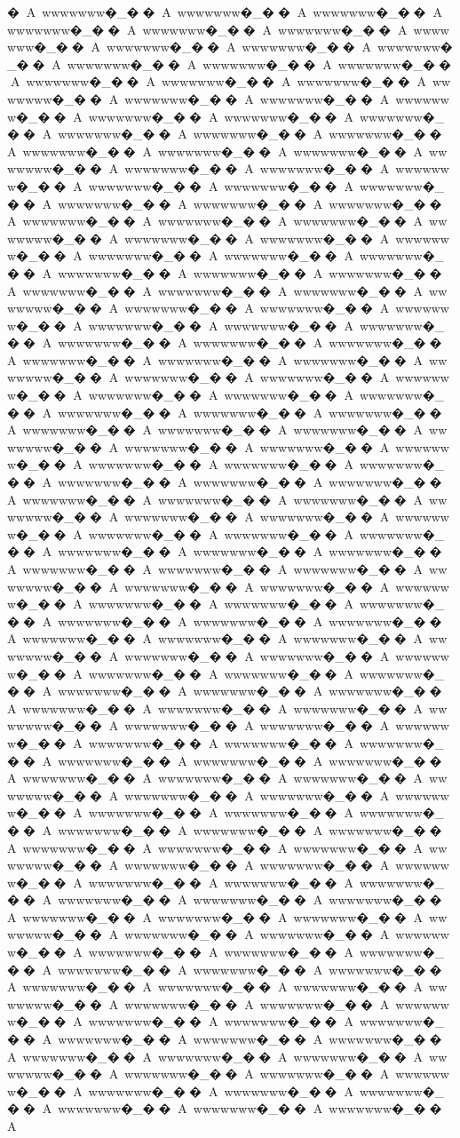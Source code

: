 {{{{�A~wwwwwww�_��A~wwwwwww�_��A~wwwwwww�_��A~wwwwwww�_��A~wwwwwww�_��A~wwwwwww�_��A~wwwwwww�_��A~wwwwwww�_��A~wwwwwww�_��A~wwwwwww�_��A~wwwwwww�_��A~wwwwwww�_��A~wwwwwww�_��A~wwwwwww�_��A~wwwwwww�_��A~wwwwwww�_��A~wwwwwww�_��A~wwwwwww�_��A~wwwwwww�_��A~wwwwwww�_��A~wwwwwww�_��A~wwwwwww�_��A~wwwwwww�_��A~wwwwwww�_��A~wwwwwww�_��A~wwwwwww�_��A~wwwwwww�_��A~wwwwwww�_��A~wwwwwww�_��A~wwwwwww�_��A~wwwwwww�_��A~wwwwwww�_��A~wwwwwww�_��A~wwwwwww�_��A~wwwwwww�_��A~wwwwwww�_��A~wwwwwww�_��A~wwwwwww�_��A~wwwwwww�_��A~wwwwwww�_��A~wwwwwww�_��A~wwwwwww�_��A~wwwwwww�_��A~wwwwwww�_��A~wwwwwww�_��A~wwwwwww�_��A~wwwwwww�_��A~wwwwwww�_��A~wwwwwww�_��A~wwwwwww�_��A~wwwwwww�_��A~wwwwwww�_��A~wwwwwww�_��A~wwwwwww�_��A~wwwwwww�_��A~wwwwwww�_��A~wwwwwww�_��A~wwwwwww�_��A~wwwwwww�_��A~wwwwwww�_��A~wwwwwww�_��A~wwwwwww�_��A~wwwwwww�_��A~wwwwwww�_��A~wwwwwww�_��A~wwwwwww�_��A~wwwwwww�_��A~wwwwwww�_��A~wwwwwww�_��A~wwwwwww�_��A~wwwwwww�_��A~wwwwwww�_��A~wwwwwww�_��A~wwwwwww�_��A~wwwwwww�_��A~wwwwwww�_��A~wwwwwww�_��A~wwwwwww�_��A~wwwwwww�_��A~wwwwwww�_��A~wwwwwww�_��A~wwwwwww�_��A~wwwwwww�_��A~wwwwwww�_��A~wwwwwww�_��A~wwwwwww�_��A~wwwwwww�_��A~wwwwwww�_��A~wwwwwww�_��A~wwwwwww�_��A~wwwwwww�_��A~wwwwwww�_��A~wwwwwww�_��A~wwwwwww�_��A~wwwwwww�_��A~wwwwwww�_��A~wwwwwww�_��A~wwwwwww�_��A~wwwwwww�_��A~wwwwwww�_��A~wwwwwww�_��A~wwwwwww�_��A~wwwwwww�_��A~wwwwwww�_��A~wwwwwww�_��A~wwwwwww�_��A~wwwwwww�_��A~wwwwwww�_��A~wwwwwww�_��A~wwwwwww�_��A~wwwwwww�_��A~wwwwwww�_��A~wwwwwww�_��A~wwwwwww�_��A~wwwwwww�_��A~wwwwwww�_��A~wwwwwww�_��A~wwwwwww�_��A~wwwwwww�_��A~wwwwwww�_��A~wwwwwww�_��A~wwwwwww�_��A~wwwwwww�_��A~wwwwwww�_��A~wwwwwww�_��A~wwwwwww�_��A~wwwwwww�_��A~wwwwwww�_��A~wwwwwww�_��A~wwwwwww�_��A~wwwwwww�_��A~wwwwwww�_��A~wwwwwww�_��A~wwwwwww�_��A~wwwwwww�_��A~wwwwwww�_��A~wwwwwww�_��A~wwwwwww�_��A~wwwwwww�_��A~wwwwwww�_��A~wwwwwww�_��A~wwwwwww�_��A~wwwwwww�_��A~wwwwwww�_��A~wwwwwww�_��A~wwwwwww�_��A~wwwwwww�_��A~wwwwwww�_��A~wwwwwww�_��A~wwwwwww�_��A~wwwwwww�_��A~wwwwwww�_��A~wwwwwww�_��A~wwwwwww�_��A~wwwwwww�_��A~wwwwwww�_��A~wwwwwww�_��A~wwwwwww�_��A~wwwwwww�_��A~wwwwwww�_��A~wwwwwww�_��A~wwwwwww�_��A~wwwwwww�_��A~wwwwwww�_��A~wwwwwww�_��A~wwwwwww�_��A~wwwwwww�_��A~wwwwwww�_��A~wwwwwww�_��A~wwwwwww�_��A~wwwwwww�_��A~wwwwwww�_��A~wwwwwww�_��A~wwwwwww�_��A~wwwwwww�_��A~wwwwwww�_��A~wwwwwww�_��A~wwwwwww�_��A~wwwwwww�_��A~wwwwwww�_��A~wwwwwww�_��A~wwwwwww�_��A~wwwwwww�_��A~wwwwwww�_��A~wwwwwww�_��A~wwwwwww�_��A~wwwwwww�_��A~wwwwwww�_��A~wwwwwww�_��A~wwwwwww�_��A~wwwwwww�_��A~wwwwwww�_��A~wwwwwww�_��A~wwwwwww�_��A~wwwwwww�_��A~wwwwwww�_��A~wwwwwww�_��A~wwwwwww�_��A~wwwwwww�_��A~wwwwwww�_��A~wwwwwww�_��A~wwwwwww�_��A~wwwwwww�_��A~wwwwwww�_��A~wwwwwww�_��A~wwwwwww�_��A~wwwwwww�_��A~wwwwwww�_��A}}}}
